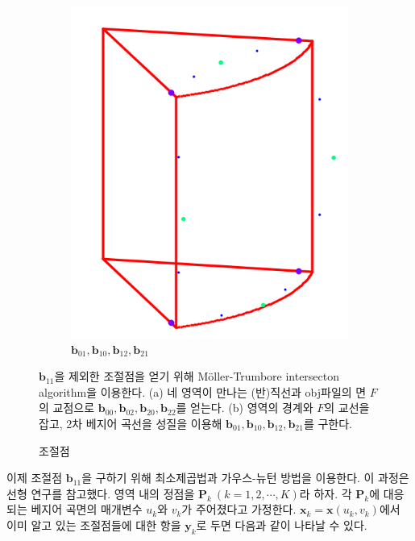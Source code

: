 \documentclass{gshs_thesis}
\theoremstyle{theorem}
\theoremstyle{lemma}
\theoremstyle{definition}
\begin{document}
\begin{figure}[h]
\begin{center}
\begin{subfigure}{.35\textwidth}
		\end{subfigure}
		\begin{subfigure}{.35\textwidth}
			\includegraphics[width=\textwidth]{image/approx2}
			\caption{$\mathbf{b}_{01}, \mathbf{b}_{10}, \mathbf{b}_{12}, \mathbf{b}_{21}$}
		\end{subfigure}
	\end{center} 
	\raggedright \small 
	\caption{조절점}$\mathbf{b}_{11}$을 제외한 조절점을 얻기 위해 Möller-Trumbore intersecton algorithm을 이용한다. (a) 네 영역이 만나는 (반)직선과 obj파일의 면 $F$의 교점으로 $\mathbf{b}_{00}, \mathbf{b}_{02}, \mathbf{b}_{20}, \mathbf{b}_{22}$를 얻는다. (b) 영역의 경계와 $F$의 교선을 잡고, 2차 베지어 곡선을 성질을 이용해 $\mathbf{b}_{01}, \mathbf{b}_{10}, \mathbf{b}_{12}, \mathbf{b}_{21}$를 구한다. 
\end{figure}
이제 조절점 $\mathbf{b}_{11}$을 구하기 위해 최소제곱법과 가우스-뉴턴 방법을 이용한다. 이 과정은 선형 연구를 참고했다. \cite{2021} 영역 내의 정점을 $\mathbf{P}_k \ (k=1, 2, \cdots, K)$라 하자. 각 $\mathbf{P}_k$에 대응되는 베지어 곡면의 매개변수 $u_k$와 $v_k$가 주어졌다고 가정한다. $\mathbf{x}_k = \mathbf{x}(u_k, v_k)$에서 이미 알고 있는 조절점들에 대한 항을 $\mathbf{y}_k$로 두면 다음과 같이 나타날 수 있다.
\end{document}
